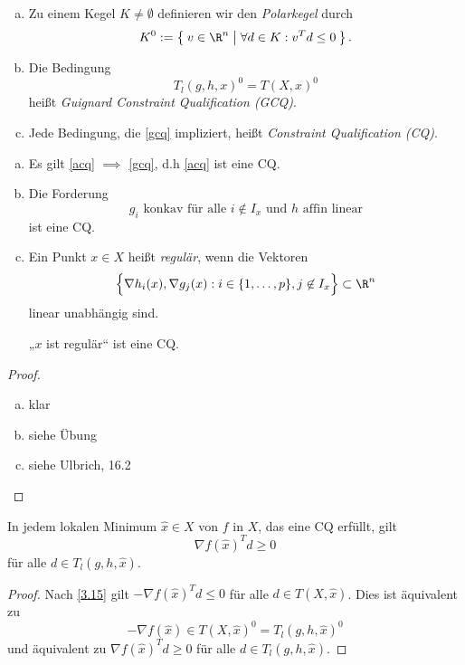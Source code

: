 \begin{df} \label{3.20}
	\begin{enumerate}[(a)]
		\item
			Zu einem Kegel $K \neq \emptyset$ definieren wir den \emph{Polarkegel} durch
			\[
				K^0 := \Set{ v \in \R^n | \forall d \in K : v^T d \le 0 }.
			\]
		\item
			Die Bedingung
			\begin{equation} \label{gcq} \tag{GCQ}
				T_l(g,h,x)^0 = T(X,x)^0
			\end{equation}
			heißt \emph{Guignard Constraint Qualification (GCQ)}.
		\item
			Jede Bedingung, die \eqref{gcq} impliziert, heißt \emph{Constraint Qualification (CQ)}.
	\end{enumerate}
\end{df}

\begin{ex} \label{3.21}
	\begin{enumerate}[(a)]
		\item
			Es gilt \eqref{acq} $\implies$ \eqref{gcq}, d.h \eqref{acq} ist eine CQ.
		\item
			Die Forderung
			\[
				\text{$g_i$ konkav für alle $i \not\in I_x$ und $h$ affin linear}
			\]
			ist eine CQ.
		\item
			Ein Punkt $x \in X$ heißt \emph{regulär}, wenn die Vektoren
			\[
				\Big\{ \nabla h_i(x), \nabla g_j(x) : i \in \{1, \dotsc, p\}, j \not\in I_x \Big\} \subset \R^n
			\]
			linear unabhängig sind.

			„$x$ ist regulär“ ist eine CQ.
	\end{enumerate}
	\begin{proof}
		\begin{enumerate}[(a)]
			\item
				klar
			\item
				siehe Übung
			\item
				siehe Ulbrich, 16.2 %
		\end{enumerate}
	\end{proof}
\end{ex}

\begin{st} \label{3.22}
	In jedem lokalen Minimum $\hat x \in X$ von $f$ in $X$, das eine CQ erfüllt, gilt
	\[
		\nabla f(\hat x)^T d \ge 0
	\]
	für alle $d \in T_l(g,h,\hat x)$.
	\begin{proof}
		Nach \ref{3.15} gilt $-\nabla f(\hat x)^T d \le 0$ für alle $d \in T(X, \hat x)$.
		Dies ist äquivalent zu
		\[
			-\nabla f(\hat x) \in T(X,\hat x)^0 = T_l (g,h,\hat x)^0
		\]
		und äquivalent zu $\nabla f(\hat x)^T d \ge 0$ für alle $d \in T_l(g, h, \hat x)$.
	\end{proof}
\end{st}

